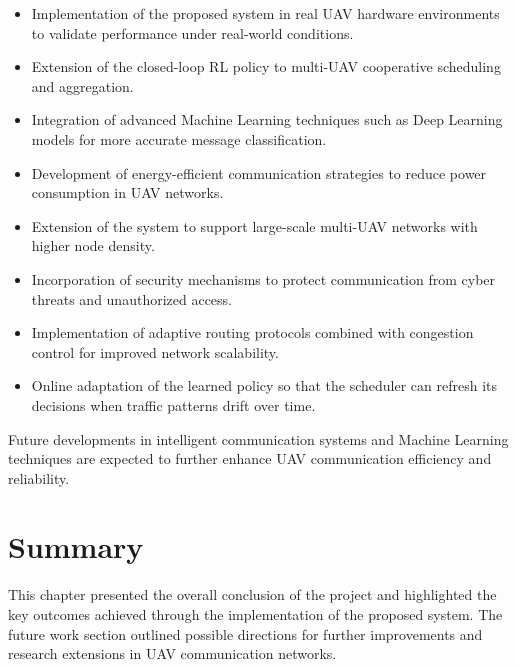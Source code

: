 \begin{itemize}

\item Implementation of the proposed system in 
real UAV hardware environments to validate 
performance under real-world conditions.

\item Extension of the closed-loop RL policy to 
multi-UAV cooperative scheduling and aggregation.

\item Integration of advanced Machine Learning 
techniques such as Deep Learning models for 
more accurate message classification.

\item Development of energy-efficient communication 
strategies to reduce power consumption in UAV 
networks.

\item Extension of the system to support large-scale 
multi-UAV networks with higher node density.

\item Incorporation of security mechanisms to 
protect communication from cyber threats and 
unauthorized access.

\item Implementation of adaptive routing protocols 
combined with congestion control for improved 
network scalability.

\item Online adaptation of the learned policy so that 
the scheduler can refresh its decisions when traffic 
patterns drift over time.

\end{itemize}

Future developments in intelligent communication 
systems and Machine Learning techniques are 
expected to further enhance UAV communication 
efficiency and reliability.


\section{Summary}

This chapter presented the overall conclusion 
of the project and highlighted the key outcomes 
achieved through the implementation of the 
proposed system. The future work section 
outlined possible directions for further 
improvements and research extensions in 
UAV communication networks.